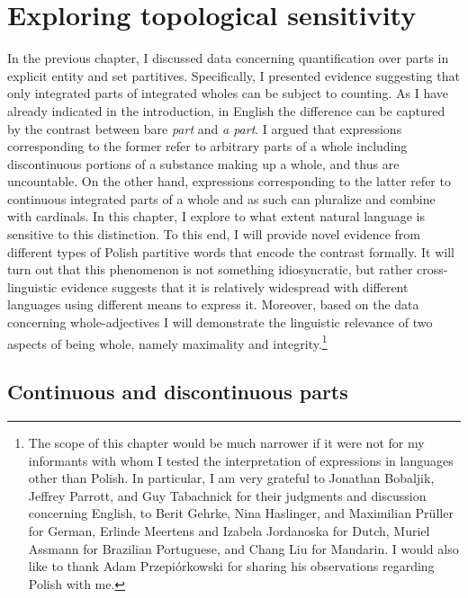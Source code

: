 \chapter{Exploring topological sensitivity}\label{ch:exploring-topological-sensitivity}

In the previous chapter, I discussed data concerning quantification over parts in explicit entity and set partitives. Specifically, I presented  evidence suggesting that only integrated parts of integrated wholes can be subject to counting. As I have already indicated in the introduction, in English the difference can be captured by the contrast between bare \textit{part} and \textit{a part}. I argued that expressions corresponding to the former refer to arbitrary parts of a whole including discontinuous portions of a substance making up a whole, and thus are uncountable. On the other hand, expressions corresponding to the latter refer to continuous integrated parts of a whole and as such can pluralize and combine with cardinals. In this chapter, I explore to what extent natural language is sensitive to this distinction. To this end, I will provide novel evidence from different types of Polish partitive words that encode the contrast formally. It will turn out that this phenomenon is not something idiosyncratic, but rather cross-linguistic evidence suggests that it is relatively widespread with different languages using different means to express it. Moreover, based on the data concerning whole-adjectives I will demonstrate the linguistic relevance of two aspects of being whole, namely maximality and integrity.\footnote{The scope of this chapter would be much narrower if it were not for my informants with whom I tested the interpretation of expressions in languages other than Polish. In particular, I am very grateful to Jonathan Bobaljik, Jeffrey Parrott, and Guy Tabachnick for their judgments and discussion concerning English, to Berit Gehrke, Nina Haslinger, and Maximilian Prüller for German, Erlinde Meertens and Izabela Jordanoska for Dutch, Muriel Assmann for Brazilian Portuguese, and Chang Liu for Mandarin. I would also like to thank Adam Przepiórkowski for sharing his observations regarding Polish with me.}

\section{Continuous and discontinuous parts}\label{sec:continuous-discontinuous-parts}

